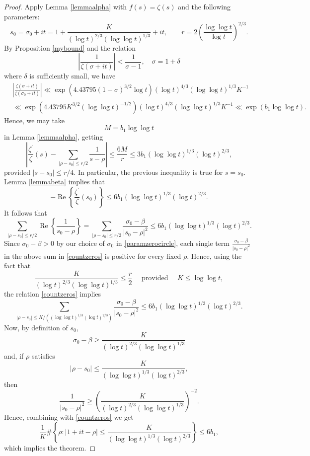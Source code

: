 \documentclass[reqno]{amsart}
\numberwithin{equation}{section}
\theoremstyle{remark}
\begin{document}
\begin{proof}
 Apply Lemma \ref{lemmaalpha} with $f(s)=\zeta(s)$ and the following parameters:
 \begin{equation}\label{paramzerocircle}
     s_0=\sigma_0+i t=1+\frac{K}{(\log t)^{2 / 3}(\log \log t)^{1 / 3}}+i t,\qquad r=2\left(\frac{\log \log t}{\log t}\right)^{2 / 3}.
 \end{equation}
By Proposition \ref{mybound} and the relation
\[\left|\frac{1}{\zeta(\sigma+it)}\right|<\frac{1}{\sigma-1},\quad \sigma=1+\delta\]
where $\delta$ is sufficiently small, we have
\begin{align*}
    &\left|\frac{\zeta(\sigma+it)}{\zeta(\sigma_0+it)}\right|\ll\exp\left(4.43795(1-\sigma)^{3/2}\log t\right)(\log t)^{4/3}(\log\log t)^{1/3}K^{-1}\\
    &\ll\exp\left(4.43795K^{3/2}(\log\log t)^{-1/2}\right)(\log t)^{4/3}(\log\log t)^{1/3}K^{-1}\ll \exp(b_1\log\log t).
\end{align*}
Hence, we may take
$$
M=b_1\log\log t
$$
in Lemma \ref{lemmaalpha}, getting 
$$
\left|\frac{\zeta^{\prime}}{\zeta}(s)-\sum_{\left|\rho-s_0\right| \leq r / 2} \frac{1}{s-\rho}\right| \le  \frac{6M}{r} \le 3b_1 (\log \log t)^{1 / 3}(\log t)^{2 / 3},
$$
provided $\left|s-s_0\right| \leq r / 4$. In particular, the previous inequality is true for $s=s_0$. Lemma \ref{lemmabeta} implies that
$$
-\operatorname{Re}\left\{\frac{\zeta^{\prime}}{\zeta}\left(s_0\right)\right\} \le 6b_1(\log \log t)^{1 / 3}(\log t)^{2 / 3}.
$$
It follows that
\begin{equation}\label{countzeros}
    \sum_{\left|\rho-s_0\right| \leq r / 2}\operatorname{Re}\left\{ \frac{1}{s_0-\rho}\right\}=\sum_{\left|\rho-s_0\right| \leq r / 2} \frac{\sigma_0-\beta}{\left|s_0-\rho\right|^2}\le6b_1(\log \log t)^{1 / 3}(\log t)^{2 / 3}.
\end{equation}
Since $\sigma_0-\beta>0$ by our choice of $\sigma_0$ in \eqref{paramzerocircle}, each single term $\frac{\sigma_0-\beta}{|s_0-\rho|^2}$ in the above sum in \eqref{countzeros} is positive for every fixed $\rho$. Hence, using the fact that
$$
\frac{K}{(\log t)^{2 / 3}(\log \log t)^{1 / 3}} \le \frac{r}{2} \quad \text { provided } \quad K \le \log \log t,
$$
the relation \eqref{countzeros} implies
$$
\sum_{\left|\rho-s_0\right| \leq K /\left((\log \log t)^{1 / 3}(\log t)^{2 / 3}\right)} \frac{\sigma_0-\beta}{\left|s_0-\rho\right|^2} \le 6b_1(\log \log t)^{1 / 3}(\log t)^{2 / 3}.
$$
Now, by definition of $s_0$, 
$$
\sigma_0-\beta \ge \frac{K}{(\log t)^{2 / 3}(\log \log t)^{1 / 3}}
$$
and, if $\rho$ satisfies
$$
\left|\rho-s_0\right| \leq\frac{K}{(\log \log t)^{1 / 3}(\log t)^{2 / 3}},
$$
then
$$
\frac{1}{\left|s_0-\rho\right|^2} \ge\left(\frac{K}{(\log t)^{2 / 3}(\log \log t)^{1 / 3}}\right)^{-2}.
$$
Hence, combining with \eqref{countzeros} we get
$$
\frac{1}{K} \#\left\{\rho:|1+i t-\rho| \leq \frac{K}{(\log \log t)^{1 / 3}(\log t)^{2 / 3}}\right\} \le 6b_1,
$$
which implies the theorem.
\end{proof}
\end{document}
